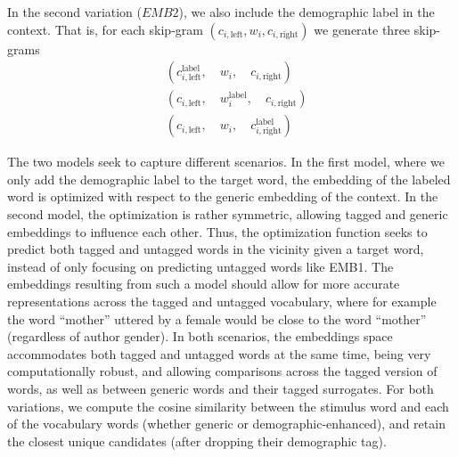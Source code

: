 \documentclass[11pt,letterpaper]{article}
\begin{document}
In the second variation ($EMB2$), we also include the demographic label in the context. That is, for each skip-gram $(c_{i,\text{left}}, w_i, c_{i,\text{right}})$ we generate three skip-grams
\vskip -0.2in
\begin{align}
&(c_{i,\text{left}}^{\text{label}}, \quad w_i, \quad c_{i,\text{right}})\nonumber\\ &(c_{i,\text{left}}, \quad w_i^{\text{label}}, \quad c_{i,\text{right}})\nonumber\\
&(c_{i,\text{left}}, \quad w_i, \quad c_{i,\text{right}}^{\text{label}})
\end{align}

The two models seek to capture different scenarios. In the first model, where we only add the demographic label to the target word, the embedding of the labeled word is optimized with respect to the generic embedding of the context. In the second model, the optimization is rather symmetric, allowing tagged and generic embeddings to influence each other. 
Thus, the optimization function seeks to predict both tagged and untagged words in the vicinity given a target word, instead of only focusing on predicting untagged words like EMB1. The embeddings resulting from such a model should allow for more accurate representations across the tagged and untagged vocabulary, where for example the word ``mother'' uttered by a female would be close to the word ``mother'' (regardless of author gender).
In both scenarios, the embeddings space accommodates both tagged and untagged words at the same time, being very computationally robust, and allowing comparisons across the tagged version of words, as well as between generic words and their tagged surrogates. For both variations, we compute the cosine similarity between the stimulus word and each of the vocabulary words (whether generic or demographic-enhanced), and retain the closest unique candidates (after dropping their demographic tag). 

\end{document}
